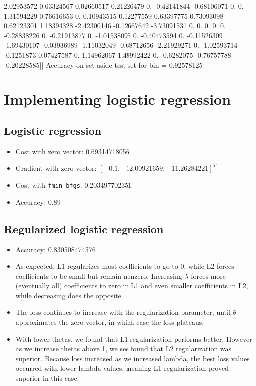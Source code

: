 \documentclass[pdftex,11pt]{article}
\begin{document}
   2.02953572  0.63324567  0.02660517  0.21226479  0.         -0.42141844
  -0.68106071  0.          0.          1.31594229  0.76616653  0.
   0.10943515  0.12277559  0.63397775  0.73093098  0.62123301  1.18394328
  -2.42300146 -0.12667642 -3.73091531  0.          0.          0.          0.
   0.         -0.28838226  0.         -0.21913877  0.         -1.01538095
   0.         -0.40473594  0.         -0.11526309 -1.69430107 -0.03936989
  -1.11032049 -0.68712656 -2.21929271  0.         -1.02593714 -0.1251873
   0.07427587  0.          1.14962067  1.49992422  0.         -0.6282075
  -0.76757788 -0.20228585]]
Accuracy on set aside test set for  bin  =  0.92578125










\section{Implementing logistic regression}
\subsection{Logistic regression}
\begin{itemize}
\item Cost with zero vector: 0.69314718056
\item Gradient with zero vector: $[ -0.1,        -12.00921659, -11.26284221]^T$
\item Cost with {\tt fmin\_bfgs}: 0.203497702351
\item Accuracy: 0.89

\end{itemize}

\subsection{Regularized logistic regression}
\begin{itemize}
\item Accuracy: 0.830508474576

\item As expected, L1 regularizes most coefficients to go to 0, while L2 forces coefficients to be small but remain nonzero. Increasing $\lambda$ forces more (eventually all) coefficients to zero in L1 and even smaller coefficients in L2, while decreasing does the opposite.
\item The loss continues to increase with the regularization parameter, until $\theta$ approximates the zero vector, in which case the loss plateaus.
\item With lower thetas, we found that L1 regularization performs better. However as we increase thetas above 1, we see found that L2 regularization was superior. Because loss increased as we increased lambda, the best loss values occurred with lower lambda values, meaning L1 regularization proved superior in this case. 
\end{itemize}
\end{document}
